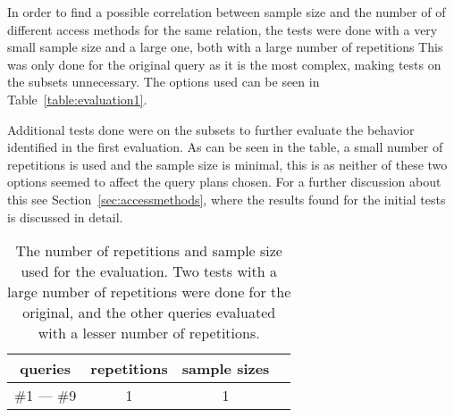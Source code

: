 In order to find a possible correlation between sample size and the number of
of different access methods for the same relation, the tests were done with a
very small sample size and a large one, both with a large number of repetitions
This was only done for the original query as it is the most complex, making
tests on the subsets unnecessary. The options used can be seen in
Table~\ref{table:evaluation1}.

Additional tests done were on the subsets to further evaluate the behavior
identified in the first evaluation. As can be seen in the table, a small number
of repetitions is used and the sample size is minimal, this is as neither of
these two options seemed to affect the query plans chosen. For a further
discussion about this see Section~\ref{sec:accessmethods}, where the results
found for the initial tests is discussed in detail.

\begin{table}
  \begin{center}
    \begin{tabu} {c c c c}
      \toprule
      queries & repetitions & sample sizes \\
      \midrule
      \#1 --- \#9  & 1 & 1 \\
      \bottomrule
    \end{tabu}
    \caption[The number of repetitions and sample size used for evaluation]{The
      number of repetitions and sample size used for the evaluation. Two tests
      with a large number of repetitions were done for the original, and the
      other queries evaluated with a lesser number of
      repetitions.}\label{table:evaluation2}
  \end{center}
\end{table}